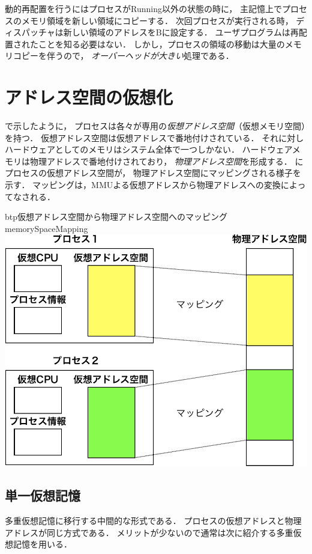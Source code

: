 動的再配置を行うにはプロセスがRunning以外の状態の時に，
主記憶上でプロセスのメモリ領域を新しい領域にコピーする．
次回プロセスが実行される時，
ディスパッチャは新しい領域のアドレスをBに設定する．
ユーザプログラムは再配置されたことを知る必要はない．
しかし，プロセスの領域の移動は大量のメモリコピーを伴うので，
\emph{オーバーヘッドが大きい}処理である．

\section{アドレス空間の仮想化}
で示したように，
プロセスは各々が専用の\emph{仮想アドレス空間}（仮想メモリ空間）を持つ．
仮想アドレス空間は仮想アドレスで番地付けされている．
それに対しハードウェアとしてのメモリはシステム全体で一つしかない．
ハードウェアメモリは物理アドレスで番地付けされており，
\emph{物理アドレス空間}を形成する．
にプロセスの仮想アドレス空間が，
物理アドレス空間にマッピングされる様子を示す．
マッピングは，MMUよる仮想アドレスから物理アドレスへの変換によってなされる．

\begin{myfig}{btp}{仮想アドレス空間から物理アドレス空間へのマッピング}
  {memorySpaceMapping}
  \includegraphics[scale=0.60]{Fig/memorySpaceMapping-crop.pdf}
\end{myfig}

\subsection{単一仮想記憶}
多重仮想記憶に移行する中間的な形式である．
プロセスの仮想アドレスと物理アドレスが同じ方式である．
メリットが少ないので通常は次に紹介する多重仮想記憶を用いる．

